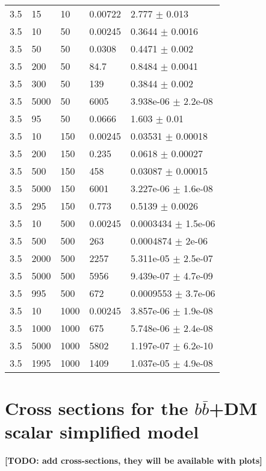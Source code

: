 \begin{longtable}{lllll}
	3.5 & 15 & 10 & 0.00722 & 2.777 $\pm$ 0.013 \\
	3.5 & 10 & 50 & 0.00245 & 0.3644 $\pm$ 0.0016 \\
	3.5 & 50 & 50 & 0.0308 & 0.4471 $\pm$ 0.002 \\
	3.5 & 200 & 50 & 84.7 & 0.8484 $\pm$ 0.0041 \\
	3.5 & 300 & 50 & 139 & 0.3844 $\pm$ 0.002 \\
	3.5 & 5000 & 50 & 6005 & 3.938e-06 $\pm$ 2.2e-08 \\
	3.5 & 95 & 50 & 0.0666 & 1.603 $\pm$ 0.01 \\
	3.5 & 10 & 150 & 0.00245 & 0.03531 $\pm$ 0.00018 \\
	3.5 & 200 & 150 & 0.235 & 0.0618 $\pm$ 0.00027 \\
	3.5 & 500 & 150 & 458 & 0.03087 $\pm$ 0.00015 \\
	3.5 & 5000 & 150 & 6001 & 3.227e-06 $\pm$ 1.6e-08 \\
	3.5 & 295 & 150 & 0.773 & 0.5139 $\pm$ 0.0026 \\
	3.5 & 10 & 500 & 0.00245 & 0.0003434 $\pm$ 1.5e-06 \\
	3.5 & 500 & 500 & 263 & 0.0004874 $\pm$ 2e-06 \\
	3.5 & 2000 & 500 & 2257 & 5.311e-05 $\pm$ 2.5e-07 \\
	3.5 & 5000 & 500 & 5956 & 9.439e-07 $\pm$ 4.7e-09 \\
	3.5 & 995 & 500 & 672 & 0.0009553 $\pm$ 3.7e-06 \\
	3.5 & 10 & 1000 & 0.00245 & 3.857e-06 $\pm$ 1.9e-08 \\
	3.5 & 1000 & 1000 & 675 & 5.748e-06 $\pm$ 2.4e-08 \\
	3.5 & 5000 & 1000 & 5802 & 1.197e-07 $\pm$ 6.2e-10 \\
	3.5 & 1995 & 1000 & 1409 & 1.037e-05 $\pm$ 4.9e-08 \\
\end{longtable}

\section{Cross sections for the $b\bar b$+DM scalar simplified model}

\textbf{[TODO: add cross-sections, they will be available with plots]}

